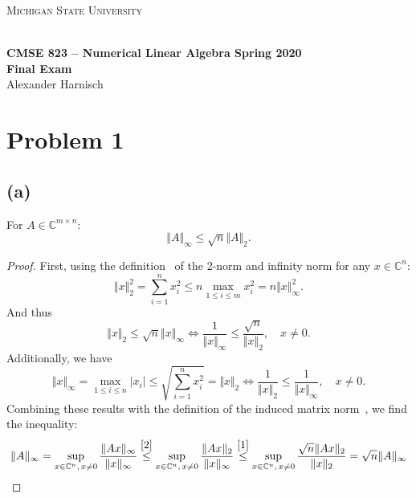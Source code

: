 \documentclass[a4paper, 11pt]{article}
\begin{document}
\newtheorem{lemma}{Lemma}
\noindent
\centerline{\small{\textsc{Michigan State University}}} \\
\large{\textbf{CMSE 823 – Numerical Linear Algebra \hfill Spring 2020 \\
Final Exam} \\
Alexander Harnisch \\}
\noindent\makebox[\linewidth]{\rule{\textwidth}{0.4pt}}

\section*{Problem 1}
\subsection*{(a)}
For $A \in \mathbb{C}^{m\times n}$:
\begin{equation}
  \Vert A\Vert_\infty \leq \sqrt{n}\Vert A \Vert_2.
  \label{eqn:a}
\end{equation}

\begin{proof}
First, using the definition~\cite[(3.2)]{tb} of the 2-norm and infinity norm
for any $x \in \mathbb{C}^n$:
\begin{equation*}
  \Vert x \Vert_2^2 = \sum_{i = 1}^n x_i^2 \leq n \max_{1 \leq i \leq m} x_i^2 = n \Vert x\Vert_\infty^2.
\end{equation*}
And thus
\begin{equation}
  \Vert x \Vert_2 \leq \sqrt{n} \Vert x \Vert_\infty \Leftrightarrow
  \frac{1}{\Vert x \Vert_\infty} \leq \frac{\sqrt{n}}{\Vert x \Vert_2},\quad x \neq 0.
  \label{1}
\end{equation}
Additionally, we have
\begin{equation}
  \Vert x \Vert_\infty = \max_{1 \leq i \leq n} \vert x_i \vert \leq
  \sqrt{\sum_{i=1}^n x_i^2} = \Vert x\Vert_2 \Leftrightarrow \frac{1}{\Vert
  x\Vert_2} \leq \frac{1}{\Vert x\Vert_\infty}, \quad x \neq 0.
  \label{2}
\end{equation}
Combining these results with the definition of the induced matrix
norm~\cite[(3.6)]{tb}, we find the inequality:
\begin{equation*}
  \Vert A \Vert_\infty = \sup_{x \in \mathbb{C}^n,\,x \neq 0} \frac{\Vert Ax
  \Vert_\infty}{\Vert x \Vert_\infty} \stackrel{\eqref{2}}{\leq}
  \sup_{x \in \mathbb{C}^n,\,x \neq 0} \frac{\Vert Ax \Vert_2}{\Vert x
  \Vert_\infty}
  \stackrel{\eqref{1}}{\leq}
  \sup_{x \in \mathbb{C}^n,\,x \neq 0} \frac{\sqrt{n}\Vert Ax \Vert_2}{\Vert x
  \Vert_2} = \sqrt{n} \Vert A \Vert_\infty
\end{equation*}
\end{proof}
\end{document}
